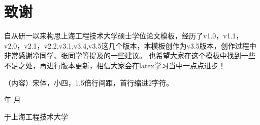 \chapter*{致谢}
\thispagestyle{plain}

自从研一以来构思上海工程技术大学硕士学位论文模板，经历了v1.0，v1.1，v2.0，v2.1，v2.2,v3.1,v3.4,v3.5这几个版本，本模板创作为v3.5版本，创作过程中非常感谢冷同学、张同学等提及的一些建议。
也希望大家在这个模板中找到一些不足之处，再进行版本更新，相信大家会在latex学习当中一点点进步！

（内容）宋体，小四，1.5倍行间距，首行缩进2字符。

\vspace{0.56\textheight}

\begin{flushright}
    \number\year    年 \number\month  月
    
    于上海工程技术大学
\end{flushright}

